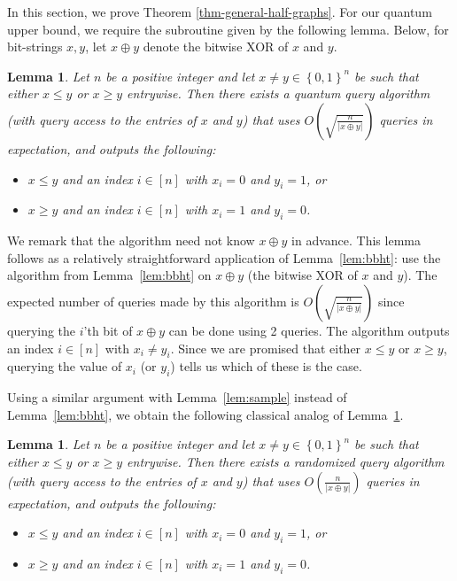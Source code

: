 \documentclass[11pt]{article}
\newcommand{\set}[1]{\left\{ #1 \right\}}
\newcommand{\zone}{\set{0,1}}
\newtheorem{lemma}[theorem]{Lemma}
\begin{document}
In this section, we prove Theorem \ref{thm-general-half-graphs}.
For our quantum upper bound, we require the subroutine given by the following lemma.
Below, for bit-strings $x, y$, let $x \oplus y$ denote the bitwise XOR of $x$ and $y$.
\begin{lemma}\label{lem: bbht useful}
    Let $n$ be a positive integer and let $x \neq y \in \zone^n$ be such that either $x \leq y$ or $x \geq y$ entrywise. Then there exists a quantum query algorithm (with query access to the entries of $x$ and $y$) that uses $O\left(\sqrt{\frac{n}{|x \oplus y|}}\right)$ queries in expectation, and outputs the following:
    \begin{itemize}
        \item $x \leq y$ and an index $i \in [n]$ with $x_i = 0$ and $y_i = 1$, or
        \item $x \geq y$ and an index $i \in [n]$ with $x_i = 1$ and $y_i = 0$.
    \end{itemize}
\end{lemma}
We remark that the algorithm need not know $x \oplus y$ in advance.
This lemma follows as a relatively straightforward application of Lemma~\ref{lem:bbht}: use the algorithm from Lemma~\ref{lem:bbht} on $x \oplus y$ (the bitwise XOR of $x$ and $y$). The expected number of queries made by this algorithm is $O\left(\sqrt{\frac{n}{|x \oplus y|}}\right)$ since querying the $i$'th bit of $x \oplus y$ can be done using 2 queries. The algorithm outputs an index $i \in [n]$ with $x_i \neq y_i$. Since we are promised that either $x \leq y$ or $x \geq y$, querying the value of $x_i$ (or $y_i$) tells us which of these is the case.

Using a similar argument with Lemma~\ref{lem:sample} instead of Lemma~\ref{lem:bbht}, we obtain the following classical analog of Lemma~\ref{lem: bbht useful}.

\begin{lemma}\label{lem: sample useful}
    Let $n$ be a positive integer and let $x \neq y \in \zone^n$ be such that either $x \leq y$ or $x \geq y$ entrywise. Then there exists a randomized query algorithm (with query access to the entries of $x$ and $y$) that uses $O\left({\frac{n}{|x \oplus y|}}\right)$ queries in expectation, and outputs the following:
    \begin{itemize}
        \item $x \leq y$ and an index $i \in [n]$ with $x_i = 0$ and $y_i = 1$, or
        \item $x \geq y$ and an index $i \in [n]$ with $x_i = 1$ and $y_i = 0$.
    \end{itemize}
\end{lemma}
\end{document}
